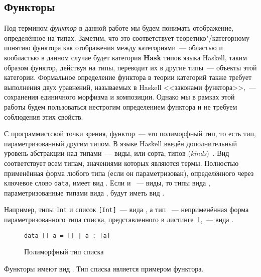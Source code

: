 \subsection{Функторы}

Под термином \emph{функтор} в данной работе мы будем понимать
отображение, определённое на типах. Заметим, что это соответствует
теоретико"/категорному понятию функтора как отображения между
категориями~--- областью и кообластью в данном случае будет категория \textbf{Hask} типов языка Haskell, таким образом функтор, действуя на типы, переводит их в другие типы~--- объекты этой категории. Формальное
определение функтора в теории категорий также требует выполнения
двух уравнений, называемых в Haskell <<законами функтора>>,~--- сохранения единичного морфизма и композиции.
Однако мы в рамках этой работы будем пользоваться нестрогим
определением функтора и не требуем соблюдения этих свойств.

С программистской точки зрения, функтор~--- это полиморфный тип,
то есть тип, параметризованный другим типом. В языке Haskell введён
дополнительный уровень абстракции над типами~--- виды, или сорта,
типов (\textsl{kinds})~\cite{Loh2015}. Вид \texttts{*} соответствует
всем типам, значениями которых являются термы. Полностью
применённая форма любого типа (если он параметризован),
определённого через ключевое слово \lstinline{data}, имеет вид
\texttts{*}. Если  и ~--- виды, то типы вида
, параметризованные типами вида , будут иметь вид
.

Например, типы \lstinline{Int} и список \lstinline{[Int]}~--- вида
\texttts{*}, а тип \texttts{[]}~--- неприменённая форма
параметризованного типа списка, представленного в
листинге~\ref{list:list},~--- вида .
\begin{figure}[h]
\begin{framed}
\lstinline{data [] a = [] | a : [a]}
\end{framed}
\caption{Полиморфный тип списка}
\label{list:list}
\end{figure}

Функторы имеют вид . Тип списка является примером
функтора.

